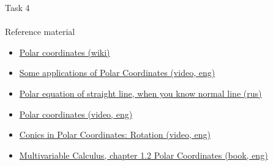 \documentclass[aspectratio=169]{beamer}
\newcommand{\fbckg}[1]{\usebackgroundtemplate{\texttt{[image: \#1]}}}%
\begin{document}
\begin{frame}[t]{Task 4}
    \framesubtitle{}
\end{frame}


\begin{frame}[t]{Reference material}
    \Large
    \begin{itemize}
        \item \href{https://en.wikipedia.org/wiki/Polar_coordinate_system}{Polar coordinates (wiki)}
        \item \href{https://youtu.be/ldoy_Md5N5E}{Some applications of Polar Coordinates (video, eng)}
        \item \href{https://studfile.net/preview/3759220/page:12/}{Polar equation of straight line, when you know normal line (rus)}
        \item \href{https://youtu.be/IAb98ZgSJNw}{Polar coordinates (video, eng)}
        \item \href{https://youtu.be/me3cBMfysZs}{Conics in Polar Coordinates: Rotation (video, eng)}
        \item \href{https://www.maths.tcd.ie/~stalker/22S1/MA22S1_Chapter_1.pdf}{Multivariable Calculus, chapter 1.2 Polar Coordinates (book, eng)}
    \end{itemize}
\end{frame}

\fbckg{fibeamer/figs/last_page.png}
\frame[plain]{}
\end{document}
